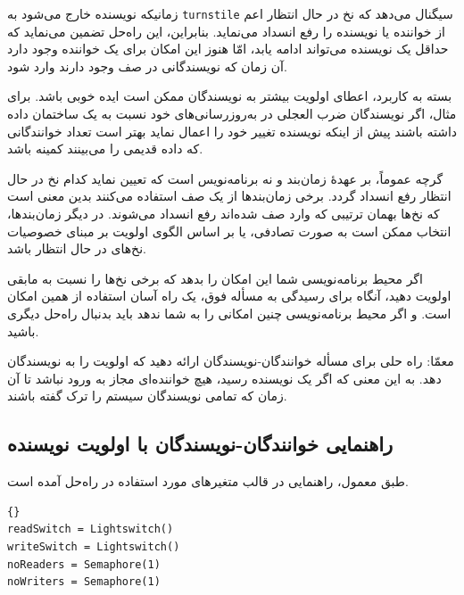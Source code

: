 \documentclass{book}
\newcommand{\clearemptydoublepage}{\newpage\cleardoublepage}
\begin{document}
    زمانیکه نویسنده خارج می‌شود  به {\tt turnstile} سیگنال می‌دهد که نخ‌ در حال انتظار اعم از خواننده یا نویسنده را رفع انسداد می‌نماید. 
    بنابراین، این راه‌حل تضمین می‌نماید که حداقل یک نویسنده می‌تواند ادامه یابد، امّا هنوز این امکان برای یک خواننده وجود دارد آن زمان که 
    نویسندگانی در صف وجود دارند وارد شود. 
    
    بسته به کاربرد، اعطای اولویت بیشتر به نویسندگان ممکن است ایده خوبی باشد. برای مثال، اگر نویسندگان ضرب العجلی در به‌روزرسانی‌های خود 
    نسبت به یک ساختمان داده‌ داشته باشند 
    پیش از اینکه نویسنده تغییر خود را اعمال نماید بهتر است تعداد خوانندگانی که داده قدیمی را می‌بینند کمینه باشد. 

    گرچه عموماً، بر عهدهٔ زمان‌بند و نه برنامه‌نویس است که تعیین نماید کدام نخ در حال انتظار رفع انسداد گردد. 
    برخی زمان‌بندها از یک صف  استفاده می‌کنند بدین معنی است که نخ‌ها بهمان ترتیبی که 
    وارد صف شده‌اند رفع انسداد می‌شوند. در دیگر زمان‌بندها، انتخاب ممکن است به صورت تصادفی، یا بر اساس الگوی اولویت  
    بر مبنای خصوصیات نخ‌های در حال انتظار باشد. 

    اگر محیط برنامه‌نویسی شما این امکان را بدهد که برخی نخ‌ها را نسبت به مابقی اولویت دهید، آنگاه برای رسیدگی به مسأله فوق، یک راه آسان استفاده از همین امکان است. 
    و اگر محیط برنامه‌نویسی چنین امکانی را به شما ندهد باید بدنبال راه‌حل دیگری باشید. 

    معمّا: راه حلی برای مسأله خوانندگان-نویسندگان ارائه دهید که اولویت را به نویسندگان  دهد. به این معنی که اگر یک نویسنده رسید، هیچ خواننده‌ای  
    مجاز به ورود نباشد تا آن زمان که تمامی نویسندگان سیستم را ترک گفته باشند. 


\clearemptydoublepage
\subsection{راهنمایی خوانندگان-نویسندگان با اولویت نویسنده}

    طبق معمول،‌ راهنمایی در قالب متغیرهای مورد استفاده در راه‌حل آمده است. 

\begin{latin}
\begin{lstlisting}[title=\rl{مقداردهی اولیه خوانندگان-نویسندگان با اولویت نویسنده}]{}
readSwitch = Lightswitch()
writeSwitch = Lightswitch()
noReaders = Semaphore(1)
noWriters = Semaphore(1)
\end{lstlisting}
\end{latin}

\end{document}
